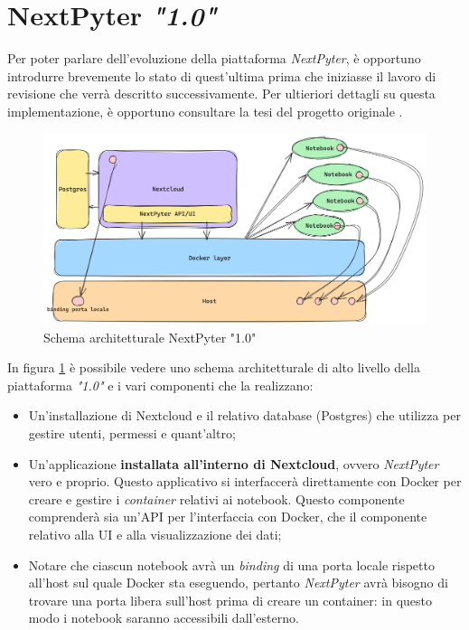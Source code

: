 \section{NextPyter \textit{"1.0"}}
Per poter parlare dell'evoluzione della piattaforma \textit{NextPyter}, è opportuno introdurre brevemente lo stato di quest'ultima prima che iniziasse il lavoro di revisione che verrà descritto successivamente.
\newline
Per ultieriori dettagli su questa implementazione, è opportuno consultare la tesi del progetto originale \cite{nextpyter-1}.
\newline
\begin{figure}[h]
    \centering
    \includegraphics[width=1\textwidth]{files/images/nextpyter-1-0.png}
    \caption{Schema architetturale NextPyter "1.0"}
    \label{fig:nextpyter-1-0-architecture}
\end{figure}
\newline
In figura \ref{fig:nextpyter-1-0-architecture} è possibile vedere uno schema architetturale di alto livello della piattaforma \textit{"1.0"} e i vari componenti che la realizzano:
\begin{itemize}
    \item Un'installazione di Nextcloud e il relativo database (Postgres) che utilizza per gestire utenti, permessi e quant'altro;
    \item Un'applicazione \textbf{installata all'interno di Nextcloud}, ovvero \textit{NextPyter} vero e proprio. Questo applicativo si interfaccerà direttamente con Docker per creare e gestire i \textit{container} relativi ai notebook. Questo componente comprenderà sia un'API per l'interfaccia con Docker, che il componente relativo alla UI e alla visualizzazione dei dati;
    \item Notare che ciascun notebook avrà un \textit{binding} di una porta locale rispetto all'host sul quale Docker sta eseguendo, pertanto \textit{NextPyter} avrà bisogno di trovare una porta libera sull'host prima di creare un container: in questo modo i notebook saranno accessibili dall'esterno.
\end{itemize}
\newpage
